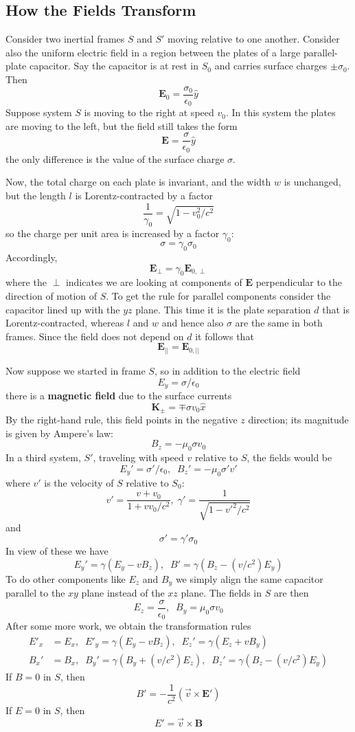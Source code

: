 \subsection{How the Fields Transform}

Consider two inertial frames $S$ and $S'$ moving relative to one another. Consider also the uniform electric field in a region between the plates of a large parallel-plate capacitor. Say the capacitor is at rest in $S_0$ and carries surface charges $\pm \sigma_0$. Then $$\mathbf{E}_0 = \frac{\sigma_0}{\epsilon_0}\hat{y}$$
Suppose system $S$ is moving to the right at speed $v_0$. In this system the plates are moving to the left, but the field still takes the form $$\mathbf{E} = \frac{\sigma}{\epsilon_0}\hat{y}$$
the only difference is the value of the surface charge $\sigma$.

Now, the total charge on each plate is invariant, and the width $w$ is unchanged, but the length $l$ is Lorentz-contracted by a factor $$\frac{1}{\gamma_0} = \sqrt{1-v_0^2/c^2}$$
so the charge per unit area is increased by a factor $\gamma_0$: $$\sigma = \gamma_0\sigma_0$$
Accordingly, $$\mathbf{E}_{\perp} = \gamma_0\mathbf{E}_{0,\perp}$$
where the $\perp$ indicates we are looking at components of $\mathbf{E}$ perpendicular to the direction of motion of $S$. To get the rule for parallel components consider the capacitor lined up with the $yz$ plane. This time it is the plate separation $d$ that is Lorentz-contracted, whereas $l$ and $w$ and hence also $\sigma$ are the same in both frames. Since the field does not depend on $d$ it follows that $$\mathbf{E}_{||} = \mathbf{E}_{0,||}$$

Now suppose we started in frame $S$, so in addition to the electric field $$E_y = \sigma/\epsilon_0$$
there is a \textbf{magnetic field} due to the surface currents $$\mathbf{K}_{\pm} = \mp\sigma v_0\hat{x}$$
By the right-hand rule, this field points in the negative $z$ direction; its magnitude is given by Ampere's law: $$B_z = -\mu_0\sigma v_0$$
In a third system, $S'$, traveling with speed $v$ relative to $S$, the fields would be $$E_y' = \sigma'/\epsilon_0,\;\;B_z' = -\mu_0\sigma'v'$$
where $v'$ is the velocity of $S$ relative to $S_0$: $$v' = \frac{v+v_0}{1+vv_0/c^2},\;\gamma' = \frac{1}{\sqrt{1-{v'}^2/c^2}}$$
and $$\sigma' = \gamma'\sigma_0$$
In view of these we have $$E_y' = \gamma(E_y - vB_z),\;\;B' = \gamma(B_z - (v/c^2)E_y)$$
To do other components like $E_z$ and $B_y$ we simply align the same capacitor parallel to the $xy$ plane instead of the $xz$ plane. The fields in $S$ are then $$E_z = \frac{\sigma}{\epsilon_0},\;\;B_y = \mu_0\sigma v_0$$
After some more work, we obtain the transformation rules \begin{align*}
    E'_x &= E_x,\;\;E'_y = \gamma(E_y-vB_z),\;\; E_z' = \gamma(E_z+vB_y) \\
    B_x' &= B_x,\;\; B_y'= \gamma(B_y+(v/c^2)E_z),\;\;B_z' = \gamma(B_z-(v/c^2)E_y)
\end{align*}
If $B = 0$ in $S$, then $$B' = -\frac{1}{c^2}(\vec{v}\times \mathbf{E}')$$
If $E = 0$ in $S$, then $$E' = \vec{v}\times \mathbf{B}$$



